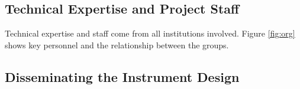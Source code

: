 \documentclass[preprint]{aastex}
\begin{document}
\vspace{-0.25in}
\subsection{Technical Expertise and Project Staff}
\vspace{-6pt}
Technical expertise and staff come from all institutions involved. 
Figure \ref{fig:org} shows key personnel and the relationship between the groups.


%
%
%
%
%
%
%

\vspace{-0.25in}
\subsection{Disseminating the Instrument Design}
\vspace{-6pt}
\end{document}
